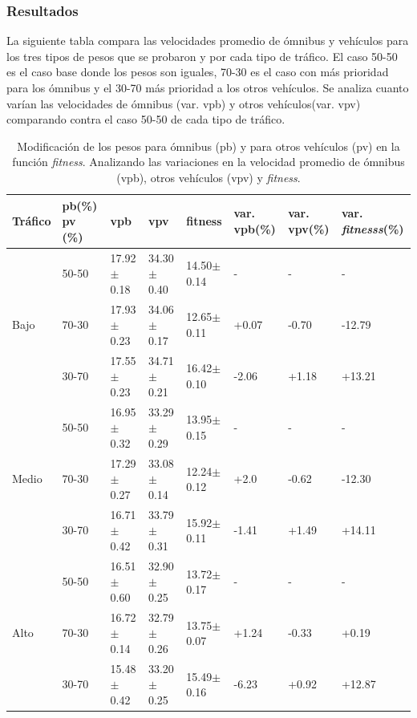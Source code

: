 \subsubsection{Resultados}

La siguiente tabla compara las velocidades promedio de ómnibus y vehículos para los tres tipos de pesos que se probaron y por cada tipo de tráfico.  El caso 50-50 es el caso base donde los pesos son iguales, 70-30 es el caso con más prioridad para los ómnibus y el 30-70 más prioridad a los otros vehículos. Se analiza cuanto varían las velocidades de ómnibus (var. vpb) y otros vehículos(var. vpv) comparando contra el caso 50-50 de cada tipo de tráfico.


\begin{table}[H]
	\renewcommand{\arraystretch}{1.2}
	\caption{Modificación de los pesos para ómnibus (pb) y para otros vehículos (pv) en la función \emph{fitness}. Analizando las variaciones en la velocidad promedio de ómnibus (vpb),  otros vehículos (vpv) y \emph{fitness}. }
	\label{table:analisis_fitness}
	\centering
	\begin{tabular}{p{1cm}p{1.2cm}p{1.8cm}p{1.8cm}p{1.8cm}p{1.2cm}p{1.2cm}p{1.2cm} }
		\hline
		Tráfico &
		pb(\%) pv (\%)& 
		vpb & 
		vpv &
		fitness &
		var. \newline vpb(\%) &
		var. \newline vpv(\%) &
		var. \newline \emph{fitnesss}(\%)
		\\ 
		\hline
		& 50-50  & 17.92$\pm$0.18 & 34.30$\pm$0.40 & 14.50$\pm$0.14  &- & - & -\\		
		Bajo & 70-30  & 17.93$\pm$0.23 & 34.06$\pm$0.17 & 12.65$\pm$0.11  & +0.07 & -0.70 & -12.79\\		
		& 30-70 & 17.55$\pm$0.23 & 34.71$\pm$0.21 & 16.42$\pm$0.10  & -2.06 & +1.18 & +13.21\\
		\hline
		
		& 50-50  & 16.95$\pm$0.32 & 33.29$\pm$0.29 & 13.95$\pm$0.15  &- & - & -\\		
		Medio & 70-30  & 17.29$\pm$0.27 & 33.08$\pm$0.14 & 12.24$\pm$0.12  & +2.0 & -0.62 & -12.30\\		
		& 30-70 & 16.71$\pm$0.42 & 33.79$\pm$0.31 & 15.92$\pm$0.11  & -1.41 & +1.49& +14.11\\
		
		\hline
		& 50-50  & 16.51$\pm$0.60 & 32.90$\pm$0.25 & 13.72$\pm$0.17  &- & - & -\\		
		Alto & 70-30  & 16.72$\pm$0.14 & 32.79$\pm$0.26 & 13.75$\pm$0.07  & +1.24 & -0.33 & +0.19\\	
		& 30-70 & 15.48$\pm$0.42 & 33.20$\pm$0.25 & 15.49$\pm$0.16  & -6.23 & +0.92 & +12.87\\
		\hline
	\end{tabular}
\end{table}



